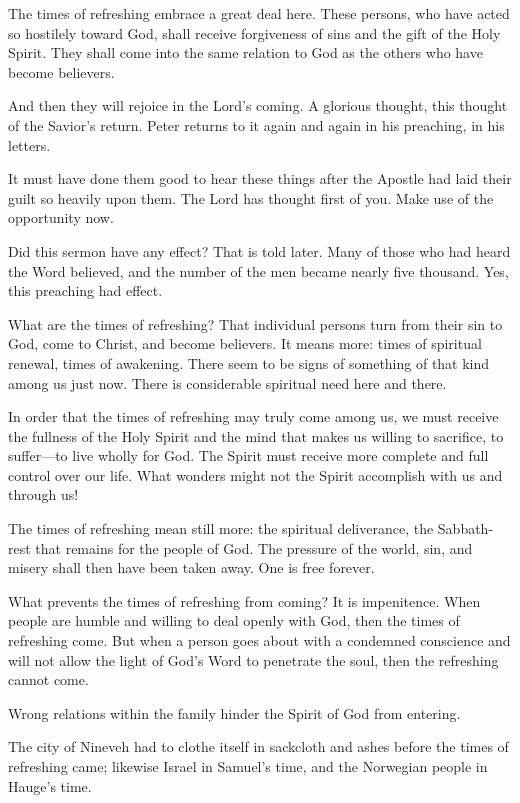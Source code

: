 The times of refreshing embrace a great deal here. These persons, who have acted so hostilely toward God, shall receive forgiveness of sins and the gift of the Holy Spirit. They shall come into the same relation to God as the others who have become believers.

And then they will rejoice in the Lord’s coming. A glorious thought, this thought of the Savior’s return. Peter returns to it again and again in his preaching, in his letters.

It must have done them good to hear these things after the Apostle had laid their guilt so heavily upon them. The Lord has thought first of you. Make use of the opportunity now.

Did this sermon have any effect? That is told later. Many of those who had heard the Word believed, and the number of the men became nearly five thousand. Yes, this preaching had effect.

What are the times of refreshing? That individual persons turn from their sin to God, come to Christ, and become believers. It means more: times of spiritual renewal, times of awakening. There seem to be signs of something of that kind among us just now. There is considerable spiritual need here and there.

In order that the times of refreshing may truly come among us, we must receive the fullness of the Holy Spirit and the mind that makes us willing to sacrifice, to suffer—to live wholly for God. The Spirit must receive more complete and full control over our life. What wonders might not the Spirit accomplish with us and through us!

The times of refreshing mean still more: the spiritual deliverance, the Sabbath-rest that remains for the people of God. The pressure of the world, sin, and misery shall then have been taken away. One is free forever.

What prevents the times of refreshing from coming? It is impenitence. When people are humble and willing to deal openly with God, then the times of refreshing come. But when a person goes about with a condemned conscience and will not allow the light of God’s Word to penetrate the soul, then the refreshing cannot come.

Wrong relations within the family hinder the Spirit of God from entering.

The city of Nineveh had to clothe itself in sackcloth and ashes before the times of refreshing came; likewise Israel in Samuel’s time, and the Norwegian people in Hauge’s time.

